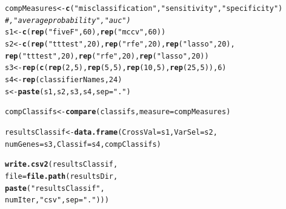 \documentclass{article}\usepackage[]{graphicx}\usepackage[]{color}
\makeatletter
\newcommand{\hlnum}[1]{\textcolor[rgb]{0.686,0.059,0.569}{#1}}%
\newcommand{\hlstr}[1]{\textcolor[rgb]{0.192,0.494,0.8}{#1}}%
\newcommand{\hlcom}[1]{\textcolor[rgb]{0.678,0.584,0.686}{\textit{#1}}}%
\newcommand{\hlstd}[1]{\textcolor[rgb]{0.345,0.345,0.345}{#1}}%
\newcommand{\hlkwb}[1]{\textcolor[rgb]{0.69,0.353,0.396}{#1}}%
\newcommand{\hlkwc}[1]{\textcolor[rgb]{0.333,0.667,0.333}{#1}}%
\newcommand{\hlkwd}[1]{\textcolor[rgb]{0.737,0.353,0.396}{\textbf{#1}}}%
\newenvironment{kframe}{%
 \def\at@end@of@kframe{}%
 \ifinner\ifhmode%
  \def\at@end@of@kframe{\end{minipage}}%
  \begin{minipage}{\columnwidth}%
 \fi\fi%
 \def\FrameCommand##1{\hskip\@totalleftmargin \hskip-\fboxsep
 \colorbox{shadecolor}{##1}\hskip-\fboxsep
     \hskip-\linewidth \hskip-\@totalleftmargin \hskip\columnwidth}%
 \MakeFramed {\advance\hsize-\width
   \@totalleftmargin\z@ \linewidth\hsize
   \@setminipage}}%
 {\par\unskip\endMakeFramed%
 \at@end@of@kframe}
\newenvironment{knitrout}{}{} %
\makeatother
\begin{document}
\begin{knitrout}
\color{fgcolor}\begin{kframe}
\begin{alltt}
\hlstd{compMeasures} \hlkwb{<-}  \hlkwd{c}\hlstd{(}\hlstr{"misclassification"}\hlstd{,} \hlstr{"sensitivity"}\hlstd{,} \hlstr{"specificity"}\hlstd{)}
                  \hlcom{# , "average probability", "auc")}
\hlstd{s1} \hlkwb{<-} \hlkwd{c}\hlstd{(}\hlkwd{rep}\hlstd{(}\hlstr{"fiveF"}\hlstd{,} \hlnum{60}\hlstd{),} \hlkwd{rep}\hlstd{(}\hlstr{"mccv"}\hlstd{,} \hlnum{60}\hlstd{))}
\hlstd{s2}\hlkwb{<-} \hlkwd{c}\hlstd{(}\hlkwd{rep}\hlstd{(}\hlstr{"tttest"}\hlstd{,}\hlnum{20}\hlstd{),} \hlkwd{rep} \hlstd{(}\hlstr{"rfe"}\hlstd{,}\hlnum{20}\hlstd{) ,}\hlkwd{rep}\hlstd{(}\hlstr{"lasso"}\hlstd{,}\hlnum{20}\hlstd{),}
       \hlkwd{rep}\hlstd{(}\hlstr{"tttest"}\hlstd{,}\hlnum{20}\hlstd{),} \hlkwd{rep}\hlstd{(}\hlstr{"rfe"}\hlstd{,}\hlnum{20}\hlstd{),} \hlkwd{rep}\hlstd{(}\hlstr{"lasso"}\hlstd{,}\hlnum{20}\hlstd{))}
\hlstd{s3} \hlkwb{<-} \hlkwd{rep}\hlstd{(}\hlkwd{c}\hlstd{(}\hlkwd{rep}\hlstd{(}\hlnum{2}\hlstd{,}\hlnum{5}\hlstd{),} \hlkwd{rep}\hlstd{(}\hlnum{5}\hlstd{,}\hlnum{5}\hlstd{),}\hlkwd{rep}\hlstd{(}\hlnum{10}\hlstd{,}\hlnum{5}\hlstd{),} \hlkwd{rep}\hlstd{(}\hlnum{25}\hlstd{,}\hlnum{5}\hlstd{)),}\hlnum{6}\hlstd{)}
\hlstd{s4} \hlkwb{<-} \hlkwd{rep}\hlstd{(classifierNames,} \hlnum{24}\hlstd{)}
\hlstd{s} \hlkwb{<-} \hlkwd{paste}\hlstd{(s1,s2,s3,s4,} \hlkwc{sep}\hlstd{=}\hlstr{"."}\hlstd{)}

\hlstd{compClassifs} \hlkwb{<-} \hlkwd{compare}\hlstd{(classifs,}  \hlkwc{measure} \hlstd{= compMeasures)}
\end{alltt}


{\ttfamily\noindent\bfseries\color{errorcolor}{\#\# Error in evaluation(clresultlist[[j]], measure = measure[i]): 'sensitivity', 'specificity' or 'auc' are only computed for binary classification}}\begin{alltt}
\hlstd{resultsClassif} \hlkwb{<-} \hlkwd{data.frame}\hlstd{(}\hlkwc{CrossVal}\hlstd{=s1,} \hlkwc{VarSel}\hlstd{=s2,}
                             \hlkwc{numGenes}\hlstd{=s3,} \hlkwc{Classif}\hlstd{=s4,compClassifs)}
\end{alltt}


{\ttfamily\noindent\bfseries\color{errorcolor}{\#\# Error in data.frame(CrossVal = s1, VarSel = s2, numGenes = s3, Classif = s4, : object 'compClassifs' not found}}\begin{alltt}
\hlkwd{write.csv2}\hlstd{(resultsClassif,}
           \hlkwc{file}\hlstd{=}\hlkwd{file.path}\hlstd{(resultsDir,}
                          \hlkwd{paste}\hlstd{(}\hlstr{"resultsClassif"}\hlstd{,}
                                \hlstd{numIter,} \hlstr{"csv"}\hlstd{,} \hlkwc{sep}\hlstd{=}\hlstr{"."}\hlstd{)))}
\end{alltt}


{\ttfamily\noindent\bfseries\color{errorcolor}{\#\# Error in is.data.frame(x): object 'resultsClassif' not found}}\end{kframe}
\end{knitrout}

 
\end{document}
